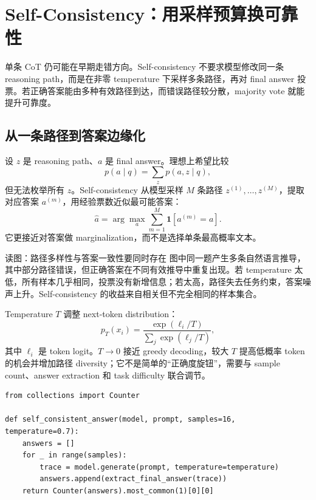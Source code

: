 \section{Self-Consistency：用采样预算换可靠性}

单条 CoT 仍可能在早期走错方向。Self-consistency 不要求模型修改同一条 reasoning path，而是在非零 temperature 下采样多条路径，再对 final answer 投票。若正确答案能由多种有效路径到达，而错误路径较分散，majority vote 就能提升可靠度。

\subsection{从一条路径到答案边缘化}

设 $z$ 是 reasoning path、$a$ 是 final answer。理想上希望比较
\[
p(a\mid q)=\sum_z p(a,z\mid q),
\]
但无法枚举所有 $z$。Self-consistency 从模型采样 $M$ 条路径 $z^{(1)},\ldots,z^{(M)}$，提取对应答案 $a^{(m)}$，用经验票数近似最可能答案：
\[
\hat a=\arg\max_a \sum_{m=1}^{M}\mathbf{1}\!\left[a^{(m)}=a\right].
\]
它更接近对答案做 marginalization，而不是选择单条最高概率文本。


\begin{knowledgebox}{读图：路径多样性与答案一致性要同时存在}
图中同一题产生多条自然语言推导，其中部分路径错误，但正确答案在不同有效推导中重复出现。若 temperature 太低，所有样本几乎相同，投票没有新增信息；若太高，路径失去任务约束，答案噪声上升。Self-consistency 的收益来自相关但不完全相同的样本集合。
\end{knowledgebox}

Temperature $T$ 调整 next-token distribution：
\[
p_T(x_i)=\frac{\exp(\ell_i/T)}{\sum_j\exp(\ell_j/T)},
\]
其中 $\ell_i$ 是 token logit。$T\to 0$ 接近 greedy decoding，较大 $T$ 提高低概率 token 的机会并增加路径 diversity；它不是简单的“正确度旋钮”，需要与 sample count、answer extraction 和 task difficulty 联合调节。

\begin{lstlisting}[caption={Self-consistency 的最小实现框架}]
from collections import Counter

def self_consistent_answer(model, prompt, samples=16, temperature=0.7):
    answers = []
    for _ in range(samples):
        trace = model.generate(prompt, temperature=temperature)
        answers.append(extract_final_answer(trace))
    return Counter(answers).most_common(1)[0][0]
\end{lstlisting}

